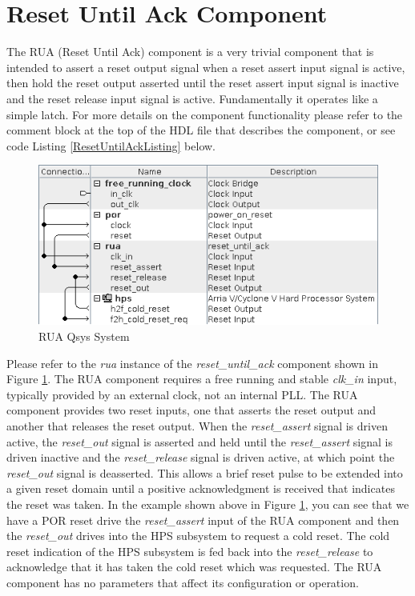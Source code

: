 \documentclass{article}
\begin{document}
\section*{Reset Until Ack Component}
\begin{flushleft}
\noindent
The RUA (Reset Until Ack) component is a very trivial component that is intended to assert a reset output signal when a reset assert input signal is active, then hold the reset output asserted until the reset assert input signal is inactive and the reset release input signal is active.  Fundamentally it operates like a simple latch.  For more details on the component functionality please refer to the comment block at the top of the HDL file that describes the component, or see code Listing \ref{ResetUntilAckListing} below.

\begin{figure}[H]
\centering
\includegraphics[scale=0.675]{rua_qsys}
\caption{RUA Qsys System}
\label{fig:rua_qsys}
\end{figure}

Please refer to the \emph{rua} instance of the \emph{reset\_until\_ack} component shown in Figure \ref{fig:rua_qsys}.  The RUA component requires a free running and stable \emph{clk\_in} input, typically provided by an external clock, not an internal PLL.  The RUA component provides two reset inputs, one that asserts the reset output and another that releases the reset output.  When the \emph{reset\_assert} signal is driven active, the \emph{reset\_out} signal is asserted and held until the \emph{reset\_assert} signal is driven inactive and the \emph{reset\_release} signal is driven active, at which point the \emph{reset\_out} signal is deasserted.  This allows a brief reset pulse to be extended into a given reset domain until a positive acknowledgment is received that indicates the reset was taken.  In the example shown above in Figure \ref{fig:rua_qsys}, you can see that we have a POR reset drive the \emph{reset\_assert} input of the RUA component and then the \emph{reset\_out} drives into the HPS subsystem to request a cold reset.  The cold reset indication of the HPS subsystem is fed back into the \emph{reset\_release} to acknowledge that it has taken the cold reset which was requested.
\newline
\newline
The RUA component has no parameters that affect its configuration or operation.


\end{flushleft}
\end{document}
